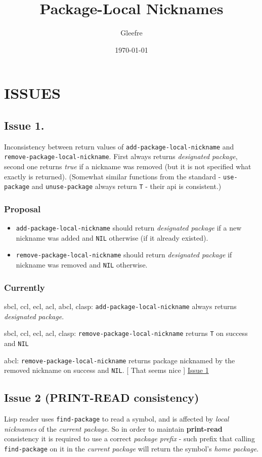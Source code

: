 \documentclass[11pt]{article}
\author{Gleefre}
\date{\today}
\title{Package-Local Nicknames}
\begin{document}

\section{ISSUES}
\label{sec:org9520579}

\subsection{Issue 1.}
\label{sec:org71b9ea1}
Inconsistency between return values of \texttt{add-package-local-nickname} and
\texttt{remove-package-local-nickname}. First always returns \emph{designated package},
second one returns \emph{true} if a nickname was removed (but it is not specified
what exactly is returned). (Somewhat similar functions from the standard -
\texttt{use-package} and \texttt{unuse-package} always return \texttt{T} - their api is
consistent.)
\subsubsection{Proposal}
\label{sec:orgfb59de8}
\begin{itemize}
\item \texttt{add-package-local-nickname} should return \emph{designated package} if a new
nickname was added and \texttt{NIL} otherwise (if it already existed).
\item \texttt{remove-package-local-nickname} should return \emph{designated package} if
nickname was removed and \texttt{NIL} otherwise.
\end{itemize}
\subsubsection{Currently}
\label{sec:orgc42c578}
sbcl, ccl, ecl, acl, abcl, clasp: \texttt{add-package-local-nickname} always returns
\emph{designated package}.

sbcl, ccl, ecl, acl, clasp: \texttt{remove-package-local-nickname} returns \texttt{T} on
success and \texttt{NIL}

 abcl: \texttt{remove-package-local-nickname} returns package nicknamed by the
 removed nickname on success and \texttt{NIL}.  [ That seems nice ]
\href{./issues/1.org}{Issue 1}

\subsection{Issue 2 (PRINT-READ consistency)}
\label{sec:org7b3a02a}
Lisp reader uses \texttt{find-package} to read a symbol, and is affected by \emph{local
nicknames} of the \emph{current package}. So in order to maintain \textbf{print-read}
consistency it is required to use a correct \emph{package prefix} - such prefix
that calling \texttt{find-package} on it in the \emph{current package} will return the
symbol's \emph{home package}.
\end{document}

